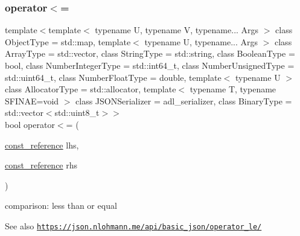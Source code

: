 \subsubsection{\texorpdfstring{operator$<$=}{operator<=}\hspace{0.1cm}{\footnotesize\ttfamily [1/3]}}
{\footnotesize\ttfamily template$<$template$<$ typename U, typename V, typename... Args $>$ class Object\+Type = std\+::map, template$<$ typename U, typename... Args $>$ class Array\+Type = std\+::vector, class String\+Type  = std\+::string, class Boolean\+Type  = bool, class Number\+Integer\+Type  = std\+::int64\+\_\+t, class Number\+Unsigned\+Type  = std\+::uint64\+\_\+t, class Number\+Float\+Type  = double, template$<$ typename U $>$ class Allocator\+Type = std\+::allocator, template$<$ typename T, typename S\+F\+I\+N\+A\+E=void $>$ class J\+S\+O\+N\+Serializer = adl\+\_\+serializer, class Binary\+Type  = std\+::vector$<$std\+::uint8\+\_\+t$>$$>$ \\
bool operator$<$= (\begin{DoxyParamCaption}\item[{\hyperlink{classnlohmann_1_1basic__json_ab8a1c33ee7b154fc41ca2545aa9724e6}{const\+\_\+reference}}]{lhs,  }\item[{\hyperlink{classnlohmann_1_1basic__json_ab8a1c33ee7b154fc41ca2545aa9724e6}{const\+\_\+reference}}]{rhs }\end{DoxyParamCaption})\hspace{0.3cm}{\ttfamily [friend]}}



comparison\+: less than or equal 

\begin{DoxySeeAlso}{See also}
\href{https://json.nlohmann.me/api/basic_json/operator_le/}{\tt https\+://json.\+nlohmann.\+me/api/basic\+\_\+json/operator\+\_\+le/} 
\end{DoxySeeAlso}
\mbox{\label{classnlohmann_1_1basic__json_ae7bce6989e2bf72aa0784ca6755e22a9}} 
